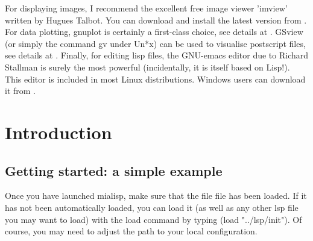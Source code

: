 \documentclass{book}
\begin{document}
For displaying images, I recommend the excellent free image viewer 'imview' written by Hugues Talbot.  You can download and install the latest version from .  For data plotting, gnuplot is certainly a first-class choice, see details at .  GSview (or simply the command gv under Un*x) can be used to visualise postscript files, see details at .  Finally, for editing lisp files, the GNU-emacs editor due to Richard Stallman is surely the most powerful (incidentally, it is itself based on Lisp!).  This editor is included in most Linux distributions.  Windows users can download it from .



\chapter{Introduction}

\section{Getting started: a simple example}
Once you have launched mialisp, make sure that the file  file has been loaded.  If it has not been automatically loaded, you can load it (as well as any other lsp file you may want to load) with the load command by typing (load "../lsp/init").  Of course, you may need to adjust the path to your local configuration.
\end{document}

